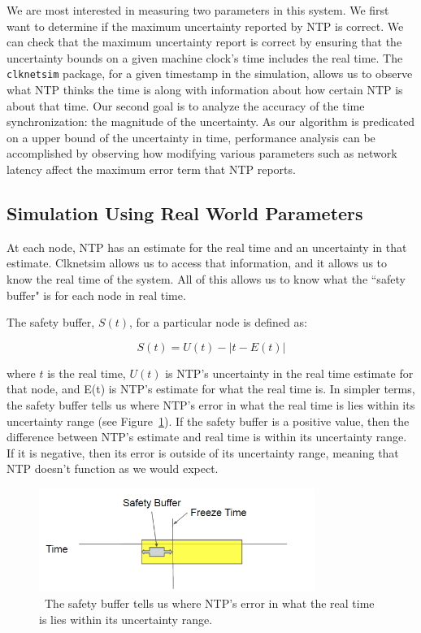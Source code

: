 We are most interested in measuring two parameters in
this system. We first want to determine if the maximum uncertainty
reported by NTP is correct. We can check that the maximum uncertainty
report is correct by ensuring that the uncertainty bounds on a given machine
clock's time includes the real time.
The \texttt{clknetsim} package, for a
given timestamp in the simulation, allows us to observe what NTP
thinks the time is along with information about how certain NTP is
about that time. Our second goal is to analyze the accuracy of the time
synchronization: the magnitude of the uncertainty. 
As our algorithm is predicated on a upper
bound of the uncertainty in time, performance analysis can be
accomplished by observing how modifying various parameters such as
network latency affect the maximum error term that NTP reports.

\subsection{Simulation Using Real World Parameters}

At each node, NTP has an estimate for the real time and an uncertainty
in that estimate. Clknetsim allows us to access that information, and
it allows us to know the real time of the system. All of this allows
us to know what the ``safety buffer" is for each node in real time.

The safety buffer, $S(t)$,  for a particular node is defined as:

\[ S(t) = U(t) - | t - E(t)| \]

where $t$ is the real time, $U(t)$ is NTP's uncertainty in the real
time estimate for that node, and E(t) is NTP's estimate for what the
real time is. In simpler terms, the safety buffer tells us where NTP's
error in what the real time is lies within its uncertainty range (see
Figure~\ref{fig:safety-diag}). If the safety buffer is a positive
value, then the difference between NTP's estimate and real time is
within its uncertainty range. If it is negative, then its error is
outside of its uncertainty range, meaning that NTP doesn't function as
we would expect.

\begin{figure}[!htbp]
  \caption{~The safety buffer tells us where NTP's error in what the real time is lies within its uncertainty range.} 
  \label{fig:safety-diag}
  \centering
  \includegraphics[width=0.8\textwidth]{safety-diagram.png}
\end{figure}

